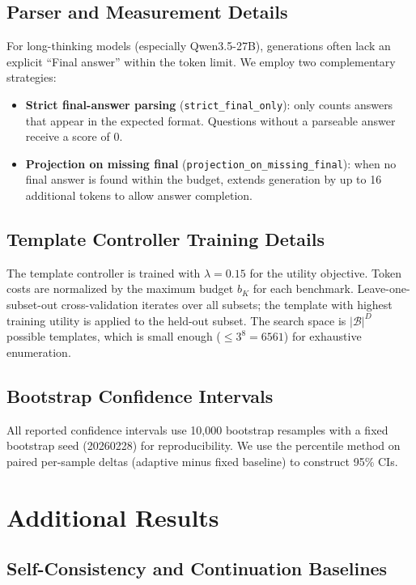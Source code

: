 \subsection{Parser and Measurement Details}
For long-thinking models (especially Qwen3.5-27B), generations often lack an explicit ``Final answer'' within the token limit.
We employ two complementary strategies:
\begin{itemize}[nosep,leftmargin=*]
    \item \textbf{Strict final-answer parsing} (\texttt{strict\_final\_only}): only counts answers that appear in the expected format. Questions without a parseable answer receive a score of 0.
    \item \textbf{Projection on missing final} (\texttt{projection\_on\_missing\_final}): when no final answer is found within the budget, extends generation by up to 16 additional tokens to allow answer completion.
\end{itemize}

\subsection{Template Controller Training Details}
The template controller is trained with $\lambda = 0.15$ for the utility objective.
Token costs are normalized by the maximum budget $b_K$ for each benchmark.
Leave-one-subset-out cross-validation iterates over all subsets; the template with highest training utility is applied to the held-out subset.
The search space is $|\mathcal{B}|^D$ possible templates, which is small enough ($\leq 3^8 = 6561$) for exhaustive enumeration.

\subsection{Bootstrap Confidence Intervals}
All reported confidence intervals use 10,000 bootstrap resamples with a fixed bootstrap seed (20260228) for reproducibility.
We use the percentile method on paired per-sample deltas (adaptive minus fixed baseline) to construct 95\% CIs.

\section{Additional Results}
\label{app:additional}

\subsection{Self-Consistency and Continuation Baselines}
\label{app:fair-sc}

